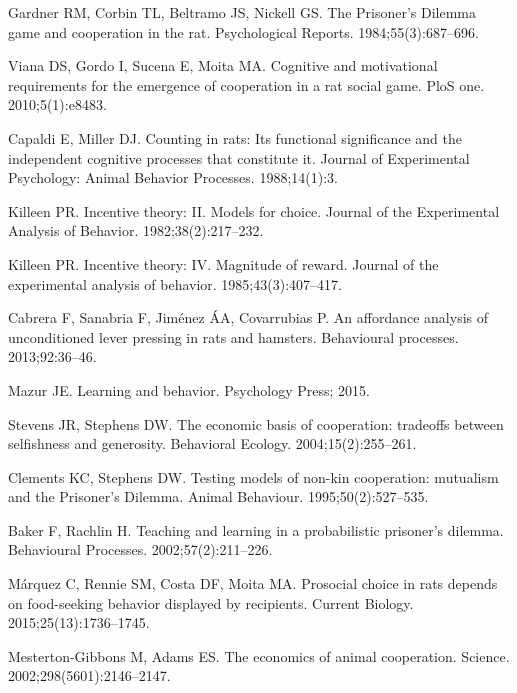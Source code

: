\documentclass[10pt,letterpaper]{article}
\begin{document}
\begin{thebibliography}{10}
Gardner RM, Corbin TL, Beltramo JS, Nickell GS.
\newblock The Prisoner's Dilemma game and cooperation in the rat.
\newblock Psychological Reports. 1984;55(3):687--696.

Viana DS, Gordo I, Sucena E, Moita MA.
\newblock Cognitive and motivational requirements for the emergence of
  cooperation in a rat social game.
\newblock PloS one. 2010;5(1):e8483.

Capaldi E, Miller DJ.
\newblock Counting in rats: Its functional significance and the independent
  cognitive processes that constitute it.
\newblock Journal of Experimental Psychology: Animal Behavior Processes.
  1988;14(1):3.

Killeen PR.
\newblock Incentive theory: II. Models for choice.
\newblock Journal of the Experimental Analysis of Behavior.
  1982;38(2):217--232.

Killeen PR.
\newblock Incentive theory: IV. Magnitude of reward.
\newblock Journal of the experimental analysis of behavior.
  1985;43(3):407--417.

Cabrera F, Sanabria F, Jim{\'e}nez {\'A}A, Covarrubias P.
\newblock An affordance analysis of unconditioned lever pressing in rats and
  hamsters.
\newblock Behavioural processes. 2013;92:36--46.

Mazur JE.
\newblock Learning and behavior.
\newblock Psychology Press; 2015.

Stevens JR, Stephens DW.
\newblock The economic basis of cooperation: tradeoffs between selfishness and
  generosity.
\newblock Behavioral Ecology. 2004;15(2):255--261.

Clements KC, Stephens DW.
\newblock Testing models of non-kin cooperation: mutualism and the Prisoner's
  Dilemma.
\newblock Animal Behaviour. 1995;50(2):527--535.

Baker F, Rachlin H.
\newblock Teaching and learning in a probabilistic prisoner's dilemma.
\newblock Behavioural Processes. 2002;57(2):211--226.

M{\'a}rquez C, Rennie SM, Costa DF, Moita MA.
\newblock Prosocial choice in rats depends on food-seeking behavior displayed
  by recipients.
\newblock Current Biology. 2015;25(13):1736--1745.

Mesterton-Gibbons M, Adams ES.
\newblock The economics of animal cooperation.
\newblock Science. 2002;298(5601):2146--2147.


\end{thebibliography}
\end{document}
